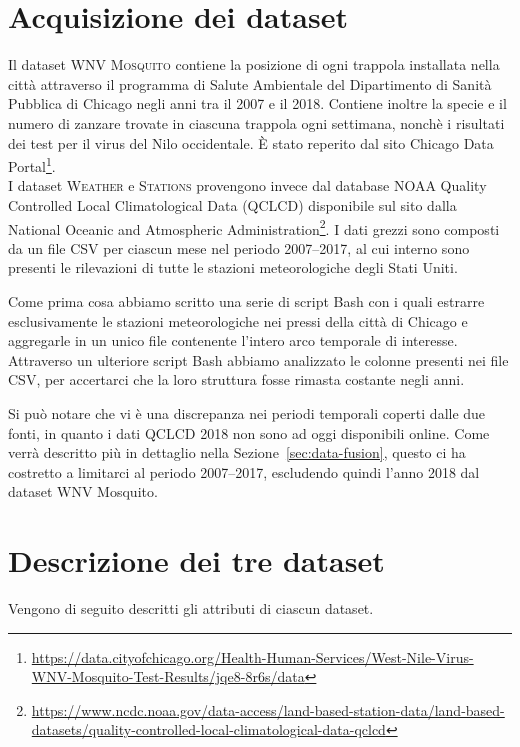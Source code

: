 \section{Acquisizione dei dataset}
Il dataset \textsc{WNV Mosquito} contiene la posizione di ogni trappola 
installata nella città attraverso il programma di Salute Ambientale del 
Dipartimento di Sanità Pubblica di Chicago negli anni tra il 2007 e il 2018. 
Contiene inoltre la specie e il numero di zanzare trovate in ciascuna trappola 
ogni settimana, nonchè i risultati dei test per il virus del Nilo occidentale. 
È stato reperito dal sito Chicago Data 
Portal\footnote{\url{https://data.cityofchicago.org/Health-Human-Services/West-Nile-Virus-WNV-Mosquito-Test-Results/jqe8-8r6s/data}}.
\\

I dataset \textsc{Weather} e \textsc{Stations} provengono invece dal database 
NOAA Quality Controlled Local Climatological Data (QCLCD) disponibile sul sito 
dalla National Oceanic and Atmospheric 
Administration\footnote{\url{https://www.ncdc.noaa.gov/data-access/land-based-station-data/land-based-datasets/quality-controlled-local-climatological-data-qclcd}}.
I dati grezzi sono composti da un file CSV per ciascun mese nel periodo 
2007--2017, al cui interno sono presenti le rilevazioni di tutte le stazioni 
meteorologiche degli Stati Uniti.

Come prima cosa abbiamo scritto una serie di script Bash con i quali estrarre 
esclusivamente le stazioni meteorologiche nei pressi della città di Chicago e 
aggregarle in un unico file contenente l'intero arco temporale di interesse. 
Attraverso un ulteriore script Bash abbiamo analizzato le colonne presenti nei 
file CSV, per accertarci che la loro struttura fosse rimasta costante negli 
anni.

Si può notare che vi è una discrepanza nei periodi temporali coperti dalle due 
fonti, in quanto i dati QCLCD 2018 non sono ad oggi disponibili online. Come 
verrà descritto più in dettaglio nella Sezione~\ref{sec:data-fusion}, 
questo ci ha costretto a limitarci al periodo 2007--2017, escludendo quindi 
l'anno 2018 dal dataset WNV Mosquito.

\section{Descrizione dei tre dataset}
Vengono di seguito descritti gli attributi di ciascun dataset.

